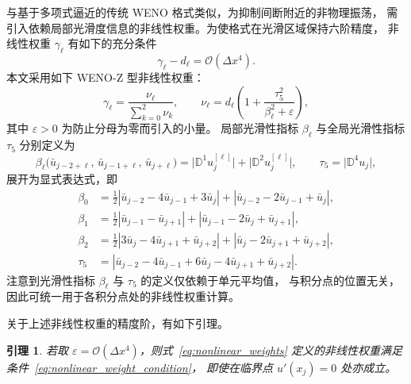 \documentclass[12pt,a4paper]{article}
\newtheorem{lemma}[theorem]{引理}
\numberwithin{equation}{section}    %
\begin{document}
与基于多项式逼近的传统 WENO 格式类似，为抑制间断附近的非物理振荡，
需引入依赖局部光滑度信息的非线性权重。为使格式在光滑区域保持六阶精度，
非线性权重 $\gamma_\ell$ 有如下的充分条件
\begin{equation}
    \label{eq:nonlinear_weight_condition}
    \gamma_\ell - d_\ell = \mathcal{O}(\Delta x^4).
\end{equation}
本文采用如下 WENO-Z 型非线性权重：
\begin{equation}
    \label{eq:nonlinear_weights}
    \gamma_\ell = \frac{\nu_\ell}{\displaystyle\sum_{k=0}^{2}\nu_k},
    \qquad
    \nu_\ell = d_\ell\left(1 + \frac{\tau_5^2}{\beta_\ell^2 + \varepsilon}\right),
\end{equation}
其中 $\varepsilon > 0$ 为防止分母为零而引入的小量。
局部光滑性指标 $\beta_\ell$ 与全局光滑性指标 $\tau_5$ 分别定义为
\begin{equation}
    \label{eq:smooth_indicator_def}
    \beta_\ell\bigl(\bar{u}_{j-2+\ell},\,\bar{u}_{j-1+\ell},\,\bar{u}_{j+\ell}\bigr)
    = \bigl|\mathbb{D}^1 u_j^{[\ell]}\bigr| + \bigl|\mathbb{D}^2 u_j^{[\ell]}\bigr|,
    \qquad
    \tau_5 = \bigl|\mathbb{D}^4 u_j\bigr|,
\end{equation}
展开为显式表达式，即
\begin{equation}
    \label{eq:beta_improved}
    \begin{aligned}
        \beta_0 &= \frac{1}{2}|\bar{u}_{j-2} - 4\bar{u}_{j-1} + 3\bar{u}_j|
                 + |\bar{u}_{j-2} - 2\bar{u}_{j-1} + \bar{u}_j|, \\
        \beta_1 &= \frac{1}{2}|\bar{u}_{j-1} - \bar{u}_{j+1}|
                 + |\bar{u}_{j-1} - 2\bar{u}_j + \bar{u}_{j+1}|, \\
        \beta_2 &= \frac{1}{2}|3\bar{u}_j - 4\bar{u}_{j+1} + \bar{u}_{j+2}|
                 + |\bar{u}_j - 2\bar{u}_{j+1} + \bar{u}_{j+2}|, \\
        \tau_5  &= |\bar{u}_{j-2} - 4\bar{u}_{j-1}
                 + 6\bar{u}_j - 4\bar{u}_{j+1} + \bar{u}_{j+2}|.
    \end{aligned}
\end{equation}
注意到光滑性指标 $\beta_\ell$ 与 $\tau_5$ 的定义仅依赖于单元平均值，
与积分点的位置无关，因此可统一用于各积分点处的非线性权重计算。

关于上述非线性权重的精度阶，有如下引理。

\begin{lemma}
    \label{lem:nonlinear_weight_order}
    若取 $\varepsilon = \mathcal{O}(\Delta x^4)$，则式~\eqref{eq:nonlinear_weights}
    定义的非线性权重满足条件~\eqref{eq:nonlinear_weight_condition}，
    即使在临界点 $u'(x_j) = 0$ 处亦成立。
\end{lemma}
\end{document}
